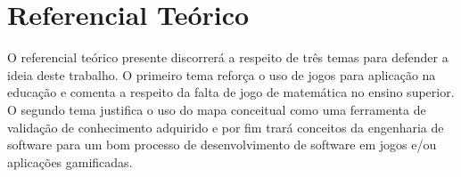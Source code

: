 \chapter[Referencial Teórico]{Referencial Teórico}
O referencial teórico presente discorrerá a respeito de três temas para defender a ideia deste trabalho. O primeiro tema  reforça o uso de jogos para aplicação na educação e comenta a respeito da falta de jogo de matemática no ensino superior. O segundo tema justifica o uso do mapa conceitual como uma ferramenta de validação de conhecimento adquirido e por fim trará conceitos da engenharia de software para um bom processo de desenvolvimento de software em jogos e/ou aplicações gamificadas. 





\begin{comment}
Existem estudos com referencial teórico apoiando o uso de gamificação em vários contextos e utilizando dos benefícios oferecidos por ela. Exemplo de contextos como marketing, saúde, educação e etc. A gamificação é também utilizada em contextos de ensino de matemática (embora não sejam muitos os resultados encontrados para universidades). Em alguns casos são utilizados a tecnologia junto da gamificação nos contextos acima citado. É dito que a tecnologia e jogos contribuem para ajudar no engajamento e chamar atenção das pessoas e dos estudantes.
Tem um estudo dizendo que não há limites para a idade de jogar, brincar e se divertir. Por isso jogo e gamificação podem ser possíveis estratégias para utilizar em comunhão de tecnologias visando o ensino de EDO 1ª ordem para estudantes do ensino superior.
 
 \end{comment}
